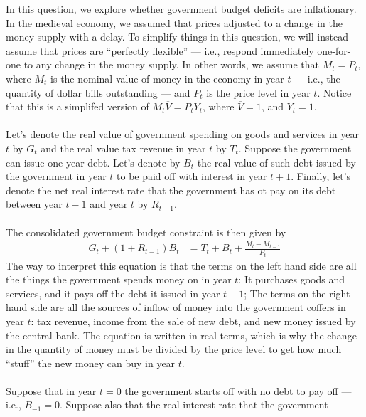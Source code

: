 \begin{homeworkProblem}[1]
    In this question, we explore whether government budget deficits are 
    inflationary. In the medieval economy, we assumed that prices adjusted
    to a change in the money supply with a delay. To simplify things in this
    question, we will instead assume that prices are ``perfectly flexible'' ---
    i.e., respond immediately one-for-one to any change in the money supply.
    In other words, we assume that $M_t = P_t$, where $M_t$ is the nominal 
    value of money in the economy in year $t$ --- i.e., the quantity of dollar
    bills outstanding --- and $P_t$ is the price level in year $t$. Notice that
    this is a simplifed version of $M_t \overline{V} = P_t Y_t$, where $\overline{V}
    = 1$, and $Y_t = 1$. 
    \\ \\
    Let's denote the \underline{real value} of government spending on goods and 
    services in year $t$ by $G_t$ and the real value tax revenue in year $t$ by
    $T_t$. Suppose the government can issue one-year debt. Let's denote by $B_t$
    the real value of such debt issued by the government in year $t$ to be paid 
    off with interest in year $t+1$. Finally, let's denote the net real interest
    rate that the government has ot pay on its debt between year $t-1$ and year $t$
    by $R_{t-1}$.
    \\ \\
    The consolidated government budget constraint is then given by
    \[
        \begin{split}
            G_t + (1 + R_{t-1}) B_t &= T_t + B_t + \frac{M_t - M_{t-1}}{P_t}
        \end{split}
    \]
    The way to interpret this equation is that the terms on the left hand side are
    all the things the government spends money on in year $t$: It purchases goods
    and services, and it pays off the debt it issued in year $t-1$; The terms on the
    right hand side are all the sources of inflow of money into the government 
    coffers in year $t$: tax revenue, income from the sale of new debt, and new money
    issued by the central bank. The equation is written in real terms, which is why
    the change in the quantity of money must be divided by the price level to get how
    much ``stuff'' the new money can buy in year $t$.
    \\ \\
    Suppose that in year $t=0$ the government starts off with no debt to pay off ---
    i.e., $B_{-1} = 0$. Suppose also that the real interest rate that the government

\end{homeworkProblem}
